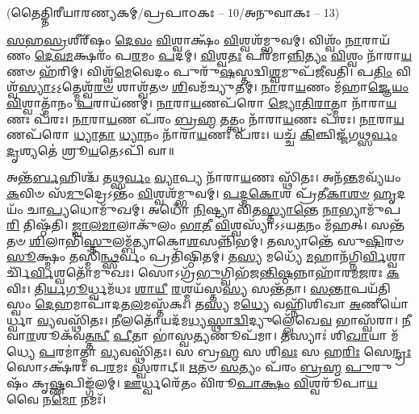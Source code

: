 

\vspace{-1ex}
\centerline{\scriptsize(𑌤𑍈𑌤𑍍𑌤𑌿𑌰𑍀𑌯𑌾𑌰𑌣𑍍𑌯𑌕𑌮𑍍/𑌪𑍍𑌰𑌪𑌾𑌠𑌕𑌃 – 10/𑌅𑌨𑍁𑌵𑌾𑌕𑌃 – 13)}

\-\ul{𑌸}\-\-\ul{𑌹}\-\-\ul{𑌸𑍍𑌰}\-𑌶𑍀𑌰𑍍᳴‌𑌷𑌂 \ul{𑌦𑍇}\-\-\ul{𑌵𑌂} \ul{𑌵𑌿}\-𑌶𑍍𑌵𑌾𑌕𑍍𑌷𑌂᳴ \ul{𑌵𑌿}\-𑌶𑍍𑌵𑌶᳴𑌮𑍍𑌭𑍁𑌵𑌮𑍍। 𑌵𑌿𑌶𑍍𑌵𑌂᳴ \ul{𑌨𑌾}\-𑌰𑌾𑌯᳴𑌣𑌂 \ul{𑌦𑍇}\-\-\ul{𑌵}\-\-\ul{𑌮}\-𑌕𑍍𑌷𑌰𑌂᳴ 𑌪\-\ul{𑌰}\-𑌮𑌂 \ul{𑌪}\-𑌦𑌮𑍍। 
\-\ul{𑌵𑌿}\-𑌶𑍍𑌵\-\ul{𑌤𑌃} 𑌪𑌰᳴𑌮𑌾\-\ul{𑌨𑍍𑌨𑌿}\-\-\ul{𑌤𑍍𑌯𑌂} \ul{𑌵𑌿}\-𑌶𑍍𑌵𑌂 𑌨𑌾᳴𑌰𑌾\-\ul{𑌯}\-𑌣𑍞 𑌹᳴𑌰𑌿𑌮𑍍। 𑌵𑌿𑌶𑍍𑌵᳴\-\ul{𑌮𑍇}\-𑌵𑍇𑌦𑌂 𑌪𑍁𑌰𑍁᳴\-\ul{𑌷}\-𑌸𑍍𑌤𑌦𑍍𑌵𑌿\-\ul{𑌶𑍍𑌵}\-𑌮𑍁𑌪᳴𑌜𑍀𑌵𑌤𑌿। 
𑌪\-\ul{𑌤𑌿𑌂}   𑌵𑌿𑌶𑍍𑌵᳴\-\ul{𑌸𑍍𑌯𑌾}\-𑌽॒𑌽॒𑌤𑍍𑌮𑍇𑌶𑍍𑌵᳴\-\ul{𑌰}\-\-\ul{𑍞} 𑌶𑌾𑌶𑍍𑌵᳴𑌤𑍞 \ul{𑌶𑌿}\-𑌵𑌮᳴𑌚𑍍𑌯𑍁𑌤𑌮𑍍। \ul{𑌨𑌾}\-𑌰𑌾\-\ul{𑌯}\-𑌣𑌂 𑌮᳴𑌹𑌾\-\ul{𑌜𑍍𑌞𑍇}\-\-\ul{𑌯𑌂} \ul{𑌵𑌿}\-𑌶𑍍𑌵𑌾𑌤𑍍𑌮𑌾᳴𑌨𑌂 \ul{𑌪}\-𑌰𑌾𑌯᳴𑌣𑌮𑍍। \ul{𑌨𑌾}\-𑌰𑌾\-\ul{𑌯}\-𑌣𑌪᳴𑌰𑍋 \ul{𑌜𑍍𑌯𑍋}\-\-\ul{𑌤𑌿}\-\-\ul{𑌰𑌾}\-𑌤𑍍𑌮𑌾 𑌨𑌾᳴𑌰𑌾\-\ul{𑌯}\-𑌣𑌃 𑌪᳴𑌰𑌃। \ul{𑌨𑌾}\-𑌰𑌾\-\ul{𑌯}\-𑌣 𑌪᳴𑌰𑌂 \ul{𑌬𑍍𑌰}\-\-\ul{𑌹𑍍𑌮} \ul{𑌤}\-𑌤𑍍𑌤𑍍𑌵𑌂 𑌨𑌾᳴𑌰𑌾\-\ul{𑌯}\-𑌣𑌃 𑌪᳴𑌰𑌃। \ul{𑌨𑌾}\-𑌰𑌾\-\ul{𑌯}\-𑌣𑌪᳴𑌰𑍋 \ul{𑌧𑍍𑌯𑌾}\-\-\ul{𑌤𑌾} \ul{𑌧𑍍𑌯𑌾}\-𑌨𑌂 𑌨𑌾᳴𑌰𑌾\-\ul{𑌯}\-𑌣𑌃 𑌪᳴𑌰𑌃। 𑌯𑌚𑍍𑌚᳴ \ul{𑌕𑌿}\-𑌞𑍍𑌚𑌿𑌜𑍍𑌜᳴𑌗\-\ul{𑌥𑍍𑌸}\-\-\ul{𑌰𑍍𑌵𑌂} \ul{𑌦𑍃}\-𑌶𑍍𑌯𑌤𑍇॑ 𑌶𑍍𑌰𑍂\-\ul{𑌯}\-𑌤𑍇𑌽𑌪𑌿᳴ 𑌵𑌾॥ 

𑌅𑌨𑍍𑌤᳴\-\ul{𑌰𑍍𑌬}\-𑌹𑌿𑌶𑍍𑌚᳴ 𑌤\-\ul{𑌥𑍍𑌸}\-\-\ul{𑌰𑍍𑌵𑌂} \ul{𑌵𑍍𑌯𑌾}\-𑌪𑍍𑌯 𑌨𑌾᳴𑌰𑌾\-\ul{𑌯}\-𑌣𑌃 𑌸𑍍𑌥𑌿᳴𑌤𑌃। 𑌅𑌨᳴\-\ul{𑌨𑍍𑌤}\-𑌮𑌵𑍍𑌯᳴𑌯𑌂 \ul{𑌕}\-𑌵𑌿𑍞 𑌸᳴\-\ul{𑌮𑍁}\-𑌦𑍍𑌰𑍇𑌽𑌨𑍍𑌤𑌂᳴  \ul{𑌵𑌿}\-𑌶𑍍𑌵𑌶᳴𑌮𑍍𑌭𑍁𑌵𑌮𑍍। \ul{𑌪}\-\-\ul{𑌦𑍍𑌮}\-\-\ul{𑌕𑍋}\-𑌶 𑌪𑍍𑌰᳴𑌤𑍀\-\ul{𑌕𑌾}\-\-\ul{𑌶}\-\-\ul{𑍞} \ul{𑌹𑍃}\-𑌦𑌯𑌂᳴ 𑌚𑌾\-\ul{𑌪𑍍𑌯}\-𑌧𑍋𑌮𑍁᳴𑌖𑌮𑍍। 𑌅𑌧𑍋᳴ \ul{𑌨𑌿}\-𑌷𑍍𑌟𑍍𑌯𑌾 𑌵𑌿᳴𑌤\-\ul{𑌸𑍍𑌤𑍍𑌯𑌾}\-\-\ul{𑌨𑍍𑌤𑍇} \ul{𑌨𑌾}\-𑌭𑍍𑌯𑌾𑌮𑍁᳴𑌪\-\ul{𑌰𑌿} 𑌤𑌿𑌷𑍍𑌠᳴𑌤𑌿। \ul{𑌜𑍍𑌵𑌾}\-\-\ul{𑌲}\-\-\ul{𑌮𑌾}\-𑌲𑌾𑌕𑍁᳴𑌲𑌂 \ul{𑌭𑌾}\-\-\ul{𑌤𑍀} \ul{𑌵𑌿}\-𑌶𑍍𑌵𑌸𑍍𑌯𑌾᳴𑌽𑌽𑌯\-\ul{𑌤}\-𑌨𑌂 𑌮᳴𑌹𑌤𑍍। 𑌸𑌨𑍍𑌤᳴𑌤𑍞 \ul{𑌶𑌿}\-𑌲𑌾𑌭𑌿᳴\-\ul{𑌸𑍍𑌤𑍁}\-\-𑌲𑌮𑍍𑌬᳴𑌤𑍍𑌯𑌾𑌕𑍋\-\ul{𑌶}\-𑌸𑌨𑍍𑌨𑌿᳴𑌭𑌮𑍍। 𑌤𑌸𑍍𑌯𑌾𑌨𑍍𑌤𑍇᳴ 𑌸𑍁\-\ul{𑌷𑌿}\-𑌰𑍞 \ul{𑌸𑍂}\-𑌕𑍍𑌷𑍍𑌮𑌂 𑌤𑌸𑍍𑌮𑌿॑\-\ul{𑌨𑍍𑌥𑍍𑌸}\-𑌰𑍍𑌵𑌂 𑌪𑍍𑌰𑌤𑌿᳴𑌷𑍍𑌠𑌿𑌤𑌮𑍍। 𑌤\-\ul{𑌸𑍍𑌯} 𑌮𑌧𑍍𑌯𑍇᳴ \ul{𑌮}\-𑌹𑌾𑌨᳴\-𑌗𑍍𑌨𑌿\-\ul{𑌰𑍍𑌵𑌿}\-𑌶𑍍𑌵𑌾𑌰𑍍𑌚𑌿᳴\-\ul{𑌰𑍍𑌵𑌿}\-𑌶𑍍𑌵𑌤𑍋᳴𑌮𑍁𑌖𑌃। 𑌸𑍋𑌽𑌗𑍍𑌰᳴\-\ul{𑌭𑍁}\-𑌗𑍍𑌵𑌿𑌭᳴𑌜\-\ul{𑌨𑍍𑌤𑌿}\-\-\ul{𑌷𑍍𑌠}\-𑌨𑍍𑌨𑌾𑌹𑌾᳴𑌰𑌮\-\ul{𑌜}\-𑌰𑌃 \ul{𑌕}\-𑌵𑌿𑌃। \ul{𑌤𑌿}\-\-\ul{𑌰𑍍𑌯}\-\-\ul{𑌗𑍂}\-𑌰𑍍𑌧𑍍𑌵𑌮᳴𑌧𑌃 \ul{𑌶𑌾}\-\-\ul{𑌯𑍀} \ul{𑌰}\-𑌶𑍍𑌮𑌯᳴𑌸𑍍𑌤\-\ul{𑌸𑍍𑌯} 𑌸𑌨𑍍𑌤᳴𑌤𑌾। \ul{𑌸}\-\-\ul{𑌨𑍍𑌤𑌾}\-𑌪𑌯᳴𑌤𑌿 𑌸𑍍𑌵𑌂 \ul{𑌦𑍇}\-𑌹𑌮𑌾𑌪𑌾᳴𑌦𑌤\-\ul{𑌲}\-𑌮𑌸𑍍𑌤᳴𑌕𑌃। 𑌤\-\ul{𑌸𑍍𑌯} 𑌮\-\ul{𑌧𑍍𑌯𑍇} 𑌵𑌹𑍍𑌨𑌿᳴𑌶𑌿𑌖𑌾 \ul{𑌅}\-𑌣𑍀𑌯𑍋॑𑌰𑍍𑌧𑍍𑌵𑌾 \ul{𑌵𑍍𑌯}\-𑌵𑌸𑍍𑌥𑌿᳴𑌤𑌃। \ul{𑌨𑍀}\-𑌲𑌤𑍋᳴𑌯𑌦᳴\-𑌮\-\ul{𑌧𑍍𑌯}\-\-\ul{𑌸𑍍𑌥𑌾}\-\-\ul{𑌦𑍍𑌵𑌿}\-𑌦𑍍𑌯𑍁𑌲𑍍𑌲𑍇᳴𑌖𑍇\-\ul{𑌵}  𑌭𑌾𑌸𑍍𑌵᳴𑌰𑌾। \ul{𑌨𑍀}\-𑌵𑌾\-\ul{𑌰}\-𑌶𑍂𑌕᳴𑌵\-\ul{𑌤𑍍𑌤}\-\-\ul{𑌨𑍍𑌵𑍀} \ul{𑌪𑍀}\-𑌤𑌾 𑌭𑌾॑𑌸𑍍𑌵\-\ul{𑌤𑍍𑌯}\-𑌣𑍂𑌪᳴𑌮𑌾। 𑌤𑌸𑍍𑌯𑌾𑌃॑ 𑌶𑌿\-\ul{𑌖𑌾}\-𑌯𑌾 𑌮᳴𑌧𑍍𑌯𑍇 \ul{𑌪}\-𑌰𑌮𑌾॑𑌤𑍍𑌮𑌾 \ul{𑌵𑍍𑌯}\-𑌵𑌸𑍍𑌥𑌿᳴𑌤𑌃। 𑌸 𑌬𑍍𑌰\-\ul{𑌹𑍍𑌮} 𑌸 𑌶𑌿\-\ul{𑌵𑌃} 𑌸 𑌹\-\ul{𑌰𑌿𑌃} 𑌸𑍇\-\ul{𑌨𑍍𑌦𑍍𑌰𑌃} 𑌸𑍋𑌽𑌕𑍍𑌷᳴𑌰𑌃 𑌪\-\ul{𑌰}\-𑌮𑌃 \ul{𑌸𑍍𑌵}\-𑌰𑌾𑌟𑍍॥ 
\-\ul{𑌋}\-𑌤𑍞 \ul{𑌸}\-𑌤𑍍𑌯𑌂 𑌪᳴𑌰𑌂 \ul{𑌬𑍍𑌰}\-\-\ul{𑌹𑍍𑌮} \ul{𑌪𑍁}\-𑌰𑍁𑌷𑌂᳴ 𑌕𑍃\-\ul{𑌷𑍍𑌣}\-𑌪𑌿𑌙𑍍𑌗᳴𑌲𑌮𑍍। \ul{𑌊}\-𑌰𑍍𑌧𑍍𑌵𑌰𑍇᳴𑌤𑌂 𑌵𑌿᳴𑌰𑍂\-\ul{𑌪𑌾}\-\-\ul{𑌕𑍍𑌷𑌂} \ul{𑌵𑌿}\-𑌶𑍍𑌵𑌰𑍂᳴𑌪𑌾\-\ul{𑌯} 𑌵𑍈 𑌨\-\ul{𑌮𑍋} 𑌨𑌮𑌃᳴। 


